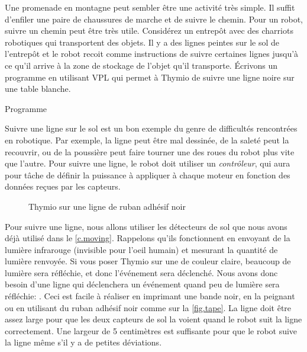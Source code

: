 \label{ch.line}

Une promenade en montagne peut sembler être une activité très simple.
Il suffit d'enfiler une paire de chaussures de marche et de suivre le chemin.
Pour un robot, suivre un chemin peut être très utile.
Considérez un entrepôt avec des charriots robotiques qui transportent des objets.
Il y a des lignes peintes sur le sol de l'entrepôt et le robot recoit comme instructions de suivre certaines lignes jusqu'à ce qu'il arrive à la zone de stockage de l'objet qu'il transporte.
Écrivons un programme en utilisant VPL qui permet à Thymio de suivre une ligne noire sur une table blanche.

{\raggedleft \hfill Programme }

Suivre une ligne sur le sol est un bon exemple du genre de difficultés rencontrées en robotique.
Par exemple, la ligne peut être mal dessinée, de la saleté peut la recouvrir, ou de la poussière peut faire tourner une des roues du robot plus vite que l'autre.
Pour suivre une ligne, le robot doit utiliser un \emph{contrôleur}, qui aura pour tâche de définir la puissance à appliquer à chaque moteur en fonction des données reçues par les capteurs.


\begin{figure}
	\hfill
	\caption{Thymio sur une ligne de ruban adhésif noir}
\end{figure}


Pour suivre une ligne, nous allons utiliser les détecteurs de sol que nous avons déjà utilisé dans le \cref{c.moving}.
Rappelons qu'ils fonctionnent en envoyant de la lumière infrarouge (invisible pour l'oeil humain) et mesurant la quantité de lumière renvoyée.
Si vous poser Thymio sur une de couleur claire, beaucoup de lumière sera réfléchie, et donc l'événement  sera déclenché.
Nous avons donc besoin d'une ligne qui déclenchera un événement quand peu de lumière sera réfléchie: .
Ceci est facile à réaliser en imprimant une bande noir, en la peignant ou en utilisant du ruban adhésif noir comme sur la \cref{fig.tape}.
La ligne doit être assez large pour que les deux capteurs de sol la voient quand le robot suit la ligne correctement.
Une largeur de 5 centimètres est suffisante pour que le robot suive la ligne même s'il y a de petites déviations.

